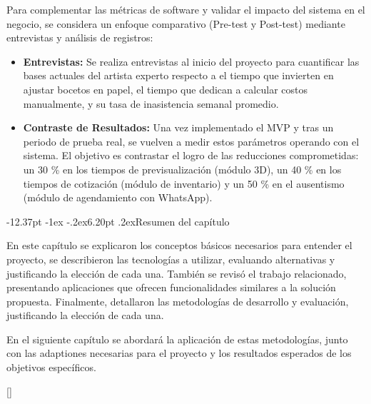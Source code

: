 \documentclass[12pt,letterpaper,oneside]{report}
\makeatletter
\renewcommand\section{\@startsection{section}{1}{\z@}%
  {-12.37pt \@plus -1ex \@minus -.2ex}{6.20pt \@plus.2ex}{\normalfont\large\bfseries}}
\makeatother
\begin{document}
Para complementar las métricas de software y validar el impacto del sistema en el negocio, se considera un enfoque comparativo (Pre-test y Post-test) mediante entrevistas y análisis de registros:
\begin{itemize}
  \item \textbf{Entrevistas:} Se realiza entrevistas al inicio del proyecto para cuantificar las bases actuales del artista experto respecto a el tiempo que invierten en ajustar bocetos en papel, el tiempo que dedican a calcular costos manualmente, y su tasa de inasistencia semanal promedio.

  \item \textbf{Contraste de Resultados:} Una vez implementado el MVP y tras un periodo de prueba real, se vuelven a medir estos parámetros operando con el sistema. El objetivo es contrastar el logro de las reducciones comprometidas: un 30 \% en los tiempos de previsualización (módulo 3D), un 40 \% en los tiempos de cotización (módulo de inventario) y un 50 \% en el ausentismo (módulo de agendamiento con WhatsApp).
\end{itemize}

\section{Resumen del capítulo}

En este capítulo se explicaron los conceptos básicos necesarios para entender el proyecto, se describieron las tecnologías a utilizar, evaluando alternativas y justificando la elección de cada una. También se revisó el trabajo relacionado, presentando aplicaciones que ofrecen funcionalidades similares a la solución propuesta. Finalmente, detallaron las metodologías de desarrollo y evaluación, justificando la elección de cada una.

En el siguiente capítulo se abordará la aplicación de estas metodologías, junto con las adaptiones necesarias para el proyecto y los resultados esperados de los objetivos específicos.
[\vspace{13.7pt}{\titlerule[2pt]}\vspace{-5pt}]
\end{document}
